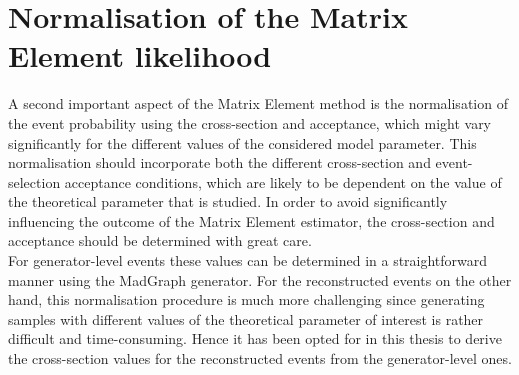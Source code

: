 
\section{Normalisation of the Matrix Element likelihood} \label{sec::Norm}

A second important aspect of the Matrix Element method is the normalisation of the event probability using the cross-section and acceptance, which might vary significantly for the different values of the considered model parameter.
This normalisation should incorporate both the different cross-section and event-selection acceptance conditions, which are likely to be dependent on the value of the theoretical parameter that is studied.
In order to avoid significantly influencing the outcome of the Matrix Element estimator, the cross-section and acceptance should be determined with great care.
\\
For generator-level events these values can be determined in a straightforward manner using the MadGraph generator. For the reconstructed events on the other hand, this normalisation procedure is much more challenging since generating samples with different values of the theoretical parameter of interest is rather difficult and time-consuming.
Hence it has been opted for in this thesis to derive the cross-section values for the reconstructed events from the generator-level ones.
\\

